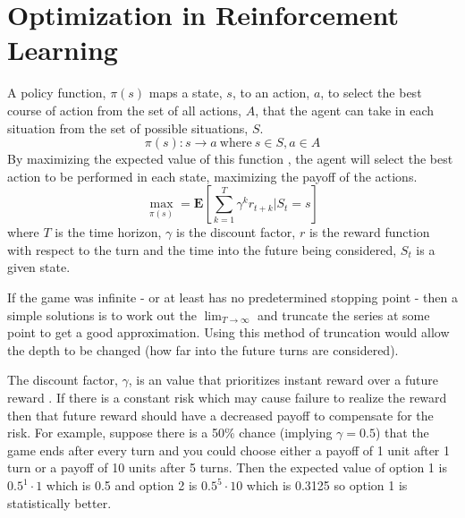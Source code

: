 \documentclass[10pt,a4paper]{report}
\begin{document}
		\section{Optimization in Reinforcement Learning}
			A policy function, $\pi(s)$ maps a state, $s$, to an action, $a$, to select the best course of action from the set of all actions, $A$, that the agent
			can take in each situation from the set of possible situations, $S$.
			\[\pi(s) : s \to a \ \text{where} \ s\in S, a \in A\]
			By maximizing the expected value of this function \autocite[p. 4]{SurveyOfOptimizationMethods}, the agent will select the
			best action to be performed in each state, maximizing the payoff of the actions.
			\begin{equation}
				\max_{\pi(s)} = \mathbf{E} \left[\sum_{k=1}^{T} \gamma^k r_{t+k} | S_t = s \right]
				\label{eq:reinforcement-learning}
			\end{equation}
			where $T$ is the time horizon, $\gamma$ is the discount factor, $r$ is the reward function with respect to the turn and
			the time into the future being considered, $S_t$ is a given state. \par
			If the game was infinite - or at least has no predetermined stopping point -
			then a simple solutions is to work out the $\lim_{T \to \infty}$ and truncate the series at some point to get a good approximation.
			Using this method of truncation would allow the depth to be changed (how far into the future turns are considered). \par
			The discount factor, $\gamma$, is an value that prioritizes instant reward over a future reward \autocite{sozou1998hyperbolic}.
			If there is a constant risk which may cause failure to realize the reward then that future reward should
			have a decreased payoff to compensate for the risk. For example, suppose there is a 50\% chance (implying $\gamma = 0.5$) that the game ends after every
			turn and you could choose either a payoff of 1 unit after 1 turn or a payoff of 10 units after 5 turns. Then the expected value of option 1 is
			$0.5^1 \cdot  1$ which is 0.5 and option 2 is $0.5^5 \cdot  10$ which is 0.3125 so option 1 is statistically better.
\end{document}
